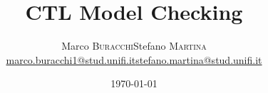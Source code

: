 





\title[CTL model checking]{\textbf{CTL Model Checking}}
\date[\today]{\flushright \today}

\author[Buracchi M. - Martina S.]{
  \begin{center}
    \begin{tabular}{lr}
      Marco \textsc{Buracchi} & Stefano \textsc{Martina}\\
      \href{mailto:marco.buracchi1@stud.unifi.it}{marco.buracchi1@stud.unifi.it}&
      \href{mailto:stefano.martina@stud.unifi.it}{stefano.martina@stud.unifi.it}\\
    \end{tabular}
  \end{center}
}


\begin{frame}[plain]
  \titlepage
\end{frame}

